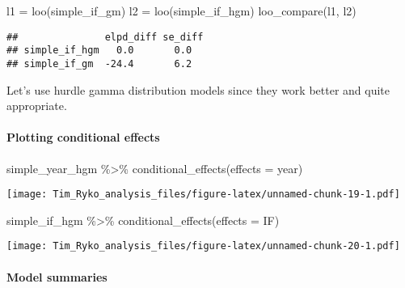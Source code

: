 \documentclass[
]{article}
\newenvironment{Shaded}{\begin{snugshade}}{\end{snugshade}}
\newcommand{\AttributeTok}[1]{\textcolor[rgb]{0.77,0.63,0.00}{#1}}
\newcommand{\FunctionTok}[1]{\textcolor[rgb]{0.00,0.00,0.00}{#1}}
\newcommand{\NormalTok}[1]{#1}
\newcommand{\OtherTok}[1]{\textcolor[rgb]{0.56,0.35,0.01}{#1}}
\newcommand{\SpecialCharTok}[1]{\textcolor[rgb]{0.00,0.00,0.00}{#1}}
\newcommand{\StringTok}[1]{\textcolor[rgb]{0.31,0.60,0.02}{#1}}
\begin{document}
\begin{Shaded}
\begin{Highlighting}[]
\NormalTok{l1 }\OtherTok{=} \FunctionTok{loo}\NormalTok{(simple\_if\_gm)}
\NormalTok{l2 }\OtherTok{=} \FunctionTok{loo}\NormalTok{(simple\_if\_hgm)}
\FunctionTok{loo\_compare}\NormalTok{(l1, l2)}
\end{Highlighting}
\end{Shaded}

\begin{verbatim}
##               elpd_diff se_diff
## simple_if_hgm   0.0       0.0  
## simple_if_gm  -24.4       6.2
\end{verbatim}

Let's use hurdle gamma distribution models since they work better and
quite appropriate.

\hypertarget{plotting-conditional-effects}{%
\paragraph{Plotting conditional
effects}\label{plotting-conditional-effects}}

\begin{Shaded}
\begin{Highlighting}[]
\NormalTok{simple\_year\_hgm }\SpecialCharTok{\%\textgreater{}\%} \FunctionTok{conditional\_effects}\NormalTok{(}\AttributeTok{effects =} \StringTok{\textquotesingle{}year\textquotesingle{}}\NormalTok{)}
\end{Highlighting}
\end{Shaded}

\texttt{[image: Tim\_Ryko\_analysis\_files/figure-latex/unnamed-chunk-19-1.pdf]}

\begin{Shaded}
\begin{Highlighting}[]
\NormalTok{simple\_if\_hgm }\SpecialCharTok{\%\textgreater{}\%} \FunctionTok{conditional\_effects}\NormalTok{(}\AttributeTok{effects =} \StringTok{\textquotesingle{}IF\textquotesingle{}}\NormalTok{)}
\end{Highlighting}
\end{Shaded}

\texttt{[image: Tim\_Ryko\_analysis\_files/figure-latex/unnamed-chunk-20-1.pdf]}

\hypertarget{model-summaries}{%
\paragraph{Model summaries}\label{model-summaries}}
\end{document}
